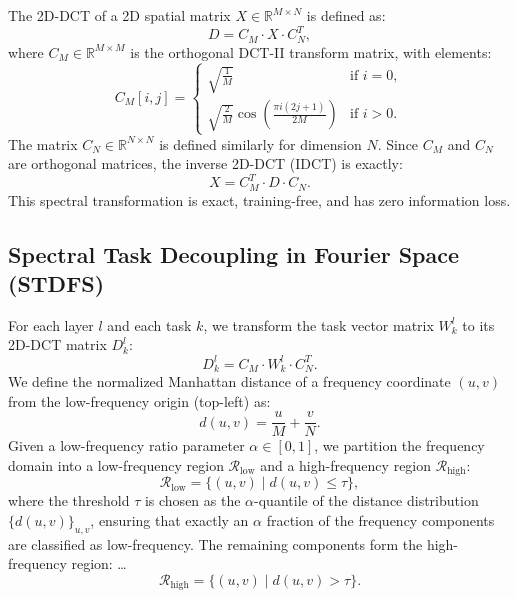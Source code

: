 \documentclass{article}
\theoremstyle{plain}
\theoremstyle{definition}
\theoremstyle{remark}
\begin{document}
The 2D-DCT of a 2D spatial matrix $X \in \mathbb{R}^{M \times N}$ is defined as:
\begin{equation}
    D = C_M \cdot X \cdot C_N^T,
\end{equation}
where $C_M \in \mathbb{R}^{M \times M}$ is the orthogonal DCT-II transform matrix, with elements:
\begin{equation}
    C_M[i, j] = 
    \begin{cases}
        \sqrt{\frac{1}{M}} & \text{if } i = 0, \\
        \sqrt{\frac{2}{M}} \cos \left( \frac{\pi i (2j + 1)}{2M} \right) & \text{if } i > 0.
    \end{cases}
\end{equation}
The matrix $C_N \in \mathbb{R}^{N \times N}$ is defined similarly for dimension $N$. Since $C_M$ and $C_N$ are orthogonal matrices, the inverse 2D-DCT (IDCT) is exactly:
\begin{equation}
    X = C_M^T \cdot D \cdot C_N.
\end{equation}
This spectral transformation is exact, training-free, and has zero information loss.

\subsection{Spectral Task Decoupling in Fourier Space (STDFS)}
For each layer $l$ and each task $k$, we transform the task vector matrix $W^l_k$ to its 2D-DCT matrix $D^l_k$:
\begin{equation}
    D^l_k = C_M \cdot W^l_k \cdot C_N^T.
\end{equation}
We define the normalized Manhattan distance of a frequency coordinate $(u, v)$ from the low-frequency origin (top-left) as:
\begin{equation}
    d(u, v) = \frac{u}{M} + \frac{v}{N}.
\end{equation}
Given a low-frequency ratio parameter $\alpha \in [0, 1]$, we partition the frequency domain into a low-frequency region $\mathcal{R}_{\text{low}}$ and a high-frequency region $\mathcal{R}_{\text{high}}$:
\begin{equation}
    \mathcal{R}_{\text{low}} = \{ (u, v) \mid d(u, v) \le \tau \},
\end{equation}
where the threshold $\tau$ is chosen as the $\alpha$-quantile of the distance distribution $\{d(u, v)\}_{u, v}$, ensuring that exactly an $\alpha$ fraction of the frequency components are classified as low-frequency. The remaining components form the high-frequency region:
\dots
\begin{equation}
    \mathcal{R}_{\text{high}} = \{ (u, v) \mid d(u, v) > \tau \}.
\end{equation}
\end{document}
